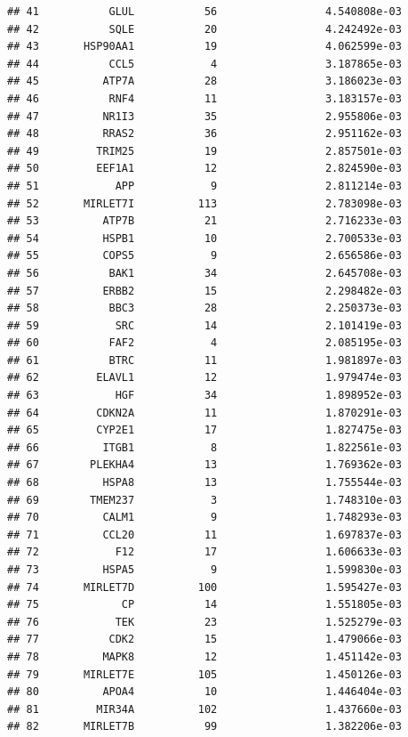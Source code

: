 \documentclass[
]{article}
\begin{document}
\begin{verbatim}
## 41           GLUL           56                 4.540808e-03
## 42           SQLE           20                 4.242492e-03
## 43       HSP90AA1           19                 4.062599e-03
## 44           CCL5            4                 3.187865e-03
## 45          ATP7A           28                 3.186023e-03
## 46           RNF4           11                 3.183157e-03
## 47          NR1I3           35                 2.955806e-03
## 48          RRAS2           36                 2.951162e-03
## 49         TRIM25           19                 2.857501e-03
## 50         EEF1A1           12                 2.824590e-03
## 51            APP            9                 2.811214e-03
## 52       MIRLET7I          113                 2.783098e-03
## 53          ATP7B           21                 2.716233e-03
## 54          HSPB1           10                 2.700533e-03
## 55          COPS5            9                 2.656586e-03
## 56           BAK1           34                 2.645708e-03
## 57          ERBB2           15                 2.298482e-03
## 58           BBC3           28                 2.250373e-03
## 59            SRC           14                 2.101419e-03
## 60           FAF2            4                 2.085195e-03
## 61           BTRC           11                 1.981897e-03
## 62         ELAVL1           12                 1.979474e-03
## 63            HGF           34                 1.898952e-03
## 64         CDKN2A           11                 1.870291e-03
## 65         CYP2E1           17                 1.827475e-03
## 66          ITGB1            8                 1.822561e-03
## 67        PLEKHA4           13                 1.769362e-03
## 68          HSPA8           13                 1.755544e-03
## 69        TMEM237            3                 1.748310e-03
## 70          CALM1            9                 1.748293e-03
## 71          CCL20           11                 1.697837e-03
## 72            F12           17                 1.606633e-03
## 73          HSPA5            9                 1.599830e-03
## 74       MIRLET7D          100                 1.595427e-03
## 75             CP           14                 1.551805e-03
## 76            TEK           23                 1.525279e-03
## 77           CDK2           15                 1.479066e-03
## 78          MAPK8           12                 1.451142e-03
## 79       MIRLET7E          105                 1.450126e-03
## 80          APOA4           10                 1.446404e-03
## 81         MIR34A          102                 1.437660e-03
## 82       MIRLET7B           99                 1.382206e-03

\end{verbatim}
\end{document}
